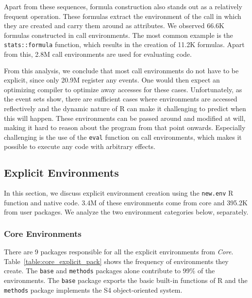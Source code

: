 \documentclass[10pt,review,sigplan,anonymous=true,authorversion=true,nonacm=true]{acmart}
\newcommand{\code}[1]{\lstinline |#1|\xspace}
\newcommand{\newEnv}{\code{new.env}}
\begin{document}
  Apart from these sequences, formula construction also stands out as a
  relatively frequent operation. These formulas extract the environment of the
  call in which they are created and carry them around as attributes. We
  observed 66.6K formulas constructed in call environments. The most common
  example is the \code{stats::formula} function, which results in the creation
  of 11.2K formulas. Apart from this, 2.8M call environments are used for
  evaluating code.


From this analysis, we conclude that most call environments do not have to be
explicit, since only 20.9M register any events. One would then expect an
optimizing compiler to optimize away accesses for these cases. Unfortunately, as
the event sets show, there are sufficient cases where environments are accessed
reflectively and the dynamic nature of R can make it challenging to predict when
this will happen. These environments can be passed around and modified at will,
making it hard to reason about the program from that point onwards. Especially
challenging is the use of the \code{eval} function on call environments, which
makes it possible to execute any code with arbitrary effects.

\subsection{Explicit Environments}
In this section, we discuss explicit environment creation using the \newEnv R
function and native code. 3.4M of these environments come from core and 395.2K
from user packages. We analyze the two environment categories below, separately.

\subsubsection{Core Environments}

There are 9 packages responsible for all the explicit environments from
\emph{Core}. Table~\ref{table:core_explicit_pack} shows the frequency of
environments they create. The \code{base} and \code{methods} packages alone
contribute to 99\% of the environments. The \code{base} package exports the
basic built-in functions of R and the \code{methods} package implements the S4
object-oriented system.
\end{document}
